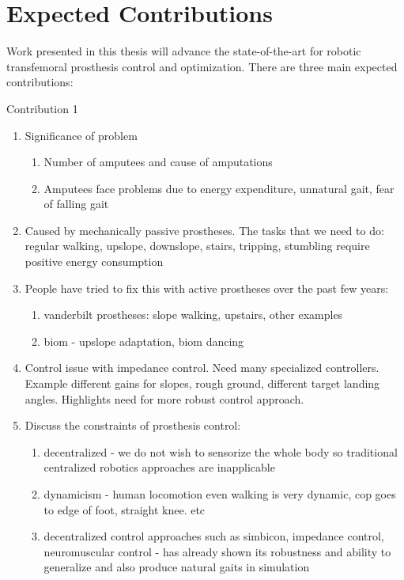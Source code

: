 \section{Expected Contributions}

Work presented in this thesis will advance the state-of-the-art for robotic
transfemoral prosthesis control and optimization. There are three main expected 
contributions: 

\begin{description}
    \item[Contribution 1]
\end{description}

\begin{enumerate}
    \item Significance of problem
    \begin{enumerate}
        \item Number of amputees and cause of amputations
        \item Amputees face problems due to energy expenditure, unnatural gait,
            fear of falling gait
    \end{enumerate}
    \item Caused by mechanically passive prostheses. The tasks that we need to
    do: regular walking, upslope, downslope, stairs, tripping, stumbling require
    positive energy consumption

    \item People have tried to fix this with active prostheses over the past few
    years:
    \begin{enumerate}
        \item vanderbilt prostheses: slope walking, upstairs, other examples
        \item biom - upslope adaptation, biom dancing
    \end{enumerate}

    \item Control issue with impedance control.  Need many specialized
    controllers. Example different gains for slopes, rough ground, different
    target landing angles. Highlights need for more robust control approach.

    \item Discuss the constraints of prosthesis control:
    \begin{enumerate}
        \item decentralized - we do not wish to sensorize the whole body so
            traditional centralized robotics approaches are inapplicable
        \item dynamicism - human locomotion even walking is very dynamic, cop
        goes to edge of foot, straight knee. etc
        \item decentralized control approaches such as simbicon, impedance
        control, neuromuscular control - has already shown its robustness and
        ability to generalize and also produce natural gaits in simulation
    \end{enumerate}


\end{enumerate}
